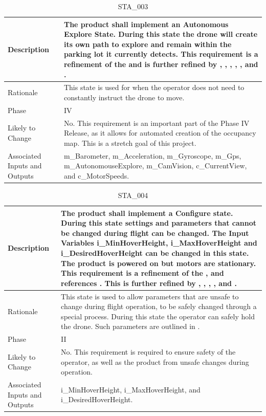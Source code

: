 \documentclass{article}
\begin{document}
\begin{table}[!h]
\begin{center}
\caption {STA\_003} 
\label{STA_003}
\begin{tabular}{ | m{3cm} | m{11cm} | }
\hline
Description & The product shall implement an Autonomous Explore State. During this state the drone will create its own path to explore and remain within the parking lot it currently detects. This requirement is a refinement of the \nameref{Autonomous Explore State} and is further refined by \nameref{PERF_001}, \nameref{PERF_004}, \nameref{PERF_007}, \nameref{SAFE_001}, \nameref{SAFE_003}, and \nameref{USE_003}. \\
\hline
Rationale & This state is used for when the operator does not need to constantly instruct the drone to move. \\
\hline
Phase & IV \\
\hline
Likely to Change & No. This requirement is an important part of the Phase IV Release, as it allows for automated creation of the occupancy map. This is a stretch goal of this project. \\
\hline
Associated Inputs and Outputs & m\_Barometer, m\_Acceleration, m\_Gyroscope, m\_Gps, m\_AutonomouseExplore, m\_CamVision, c\_CurrentView, and c\_MotorSpeeds. \\
\hline
\end{tabular}
\end{center}
\end{table}

\begin{table}[!h]
\begin{center}
\caption {STA\_004} 
\label{STA_004}
\begin{tabular}{ | m{3cm} | m{11cm} | }
\hline
Description & The product shall implement a Configure state. During this state settings and parameters that cannot be changed during flight can be changed. The Input Variables i\_MinHoverHeight, i\_MaxHoverHeight and i\_DesiredHoverHeight can be changed in this state. The product is powered on but motors are stationary. This requirement is a refinement of the \nameref{Configure State}, and references \nameref{GEN_003}. This is further refined by \nameref{PERF_004}, \nameref{PERF_007}, \nameref{SAFE_001}, \nameref{SAFE_003}, and \nameref{USE_003}. \\
\hline
Rationale & This state is used to allow parameters that are unsafe to change during flight operation, to be safely changed through a special process. During this state the operator can safely hold the drone. Such parameters are outlined in \nameref{InputVariables}. \\
\hline
Phase & II \\
\hline
Likely to Change & No. This requirement is required to ensure safety of the operator, as well as the product from unsafe changes during operation. \\
\hline
Associated Inputs and Outputs &  i\_MinHoverHeight, i\_MaxHoverHeight, and i\_DesiredHoverHeight. \\
\hline
\end{tabular}
\end{center}
\end{table}
\end{document}
